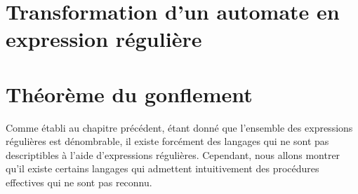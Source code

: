 \section{Transformation d'un automate en expression régulière}

\section{Théorème du gonflement}

Comme établi au chapitre précédent, étant donné que l'ensemble des expressions régulières est dénombrable, il existe forcément des langages qui ne sont pas descriptibles à l'aide d'expressions régulières. Cependant, nous allons montrer qu'il existe certains langages qui admettent intuitivement des procédures effectives qui ne sont pas reconnu.